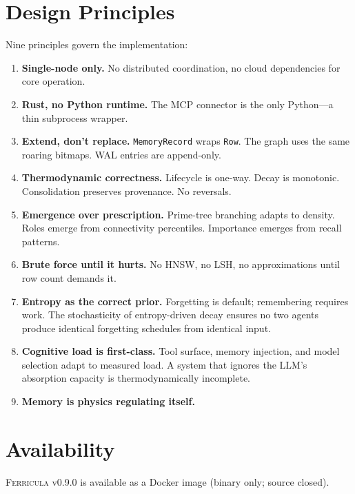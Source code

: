 \documentclass[twocolumn,10pt]{article}
\begin{document}
\section{Design Principles}

Nine principles govern the implementation:

\begin{enumerate}[leftmargin=*,itemsep=2pt]
\item \textbf{Single-node only.}  No distributed coordination,
  no cloud dependencies for core operation.
\item \textbf{Rust, no Python runtime.}  The MCP connector is
  the only Python---a thin subprocess wrapper.
\item \textbf{Extend, don't replace.}  \texttt{MemoryRecord}
  wraps \texttt{Row}.  The graph uses the same roaring bitmaps.
  WAL entries are append-only.
\item \textbf{Thermodynamic correctness.}  Lifecycle is one-way.
  Decay is monotonic.  Consolidation preserves provenance.
  No reversals.
\item \textbf{Emergence over prescription.}  Prime-tree branching
  adapts to density.  Roles emerge from connectivity percentiles.
  Importance emerges from recall patterns.
\item \textbf{Brute force until it hurts.}  No HNSW, no LSH,
  no approximations until row count demands it.
\item \textbf{Entropy as the correct prior.}  Forgetting is default;
  remembering requires work.  The stochasticity of entropy-driven decay
  ensures no two agents produce identical forgetting schedules from
  identical input.
\item \textbf{Cognitive load is first-class.}  Tool surface, memory
  injection, and model selection adapt to measured load.  A system that
  ignores the LLM's absorption capacity is thermodynamically incomplete.
\item \textbf{Memory is physics regulating itself.}
\end{enumerate}

\section{Availability}

\textsc{Ferricula} v0.9.0 is available as a Docker image (binary only; source closed).
\end{document}
